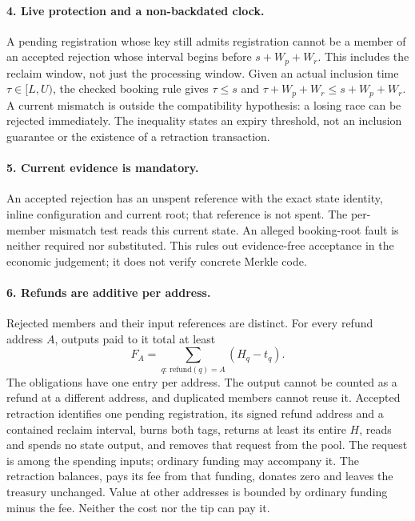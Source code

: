 \paragraph{4. Live protection and a non-backdated clock.}
\checked A pending registration whose key still admits registration cannot
be a member of an accepted rejection whose interval begins before $s+W_p+W_r$.
This includes the reclaim window, not just the processing window. Given an
actual inclusion time $\tau\in[L,U)$, the checked booking rule gives
$\tau\le s$ and $\tau+W_p+W_r\le s+W_p+W_r$.
A current mismatch is outside the compatibility hypothesis: a losing race
can be rejected immediately. The inequality states an expiry threshold, not
an inclusion guarantee or the existence of a retraction transaction.

\paragraph{5. Current evidence is mandatory.}
\checked An accepted rejection has an unspent reference with the exact state
identity, inline configuration and current root; that reference is not spent.
The per-member mismatch test reads this current state. An alleged booking-root
fault is neither required nor substituted. This rules out evidence-free
acceptance in the economic judgement; it does not verify concrete Merkle code.

\paragraph{6. Refunds are additive per address.}
\checked Rejected members and their input references are distinct. For every
refund address $A$, outputs paid to it total at least
\[
 F_A=\sum_{q:\,\mathrm{refund}(q)=A}(H_q-t_q).
\]
The obligations have one entry per address. The output cannot be counted as a
refund at a different address, and duplicated members cannot reuse it.
\checked Accepted retraction identifies one pending registration, its signed
refund address and a contained reclaim interval, burns both tags, returns at
least its entire $H$, reads and spends no state output, and removes that
request from the pool.
\checked The request is among the spending inputs; ordinary funding may
accompany it. The retraction balances, pays its fee from that funding, donates
zero and leaves the treasury unchanged. Value at other addresses is bounded
by ordinary funding minus the fee. Neither the cost nor the tip can pay it.


